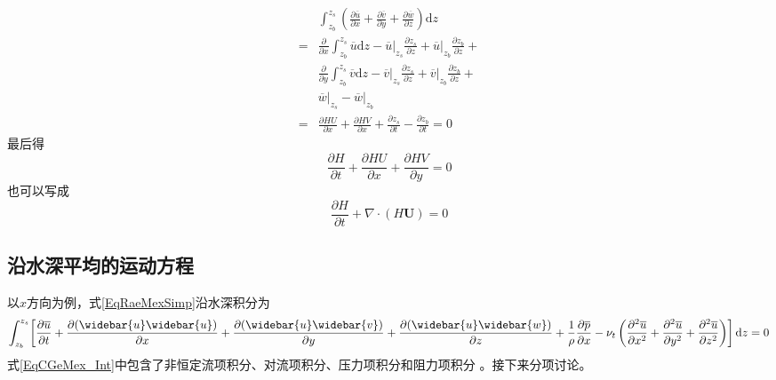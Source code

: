 \begin{equation*}
  \begin{aligned}
    &\int_{z_{b}}^{ z_{s}}\!
    \left(
    \frac{\partial \overline{u}}{\partial x} +
    \frac{\partial \overline{v}}{\partial y} +
    \frac{\partial \overline{w}}{\partial z}
    \right)
    \mathrm{d}z
    \\
    =&
    \frac{\partial}{\partial x}
    \int_{z_{b}}^{ z_{s}}\!
    \overline{u}
    \mathrm{d}z
    -
    \left.\overline{u}\right|_{z_{s}}
    \frac{\partial z_{s}}{\partial z}
    +
    \left.\overline{u}\right|_{z_{b}}
    \frac{\partial z_{b}}{\partial z}
    + \\
    &
    \frac{\partial}{\partial y}
    \int_{z_{b}}^{ z_{s}}\!
    \overline{v}
    \mathrm{d}z
    -
    \left.\overline{v}\right|_{z_{s}}
    \frac{\partial z_{s}}{\partial z}
    +
    \left.\overline{v}\right|_{z_{b}}
    \frac{\partial z_{b}}{\partial z}
    + \\
    &
    \left.\overline{w}\right|_{z_{s}}
    -
    \left.\overline{w}\right|_{z_{b}}
    \\
    =&
    \frac{\partial HU}{\partial x} +
    \frac{\partial HV}{\partial x} +
    \frac{\partial  z_{s}}{\partial t} -
    \frac{\partial z_{b}}{\partial t}
    =
    0
  \end{aligned}
\end{equation*}
最后得
\begin{equation}
  \frac{\partial H}{\partial t} +
  \frac{\partial HU}{\partial x} +
  \frac{\partial HV}{\partial y}
  =
  0
\end{equation}
也可以写成
\begin{equation}
  \frac{\partial H}{\partial t} +
  \nabla\cdot(H\mathbf{U})
  =
  0
\end{equation}

\subsection{沿水深平均的运动方程}
以$x$方向为例，式\eqref{EqRaeMexSimp}沿水深积分为
\begin{equation}
  \int_{z_{b}}^{ z_{s}}\!
  \left[
    \frac{\partial \overline{u}}{\partial t} +
    \frac{\partial (\widebar{u}\widebar{u})}{\partial x} +
    \frac{\partial (\widebar{u}\widebar{v})}{\partial y} +
    \frac{\partial (\widebar{u}\widebar{w})}{\partial z} +
    \frac{1}{\rho}\frac{\partial \overline{p}}{\partial x} -
    \nu_{t}
    \left(
    \frac{\partial^{2} \overline{u}}{\partial x^{2}} +
    \frac{\partial^{2} \overline{u}}{\partial y^{2}} +
    \frac{\partial^{2} \overline{u}}{\partial z^{2}}
    \right)
  \right]
  \mathrm{d}z
  =
  0
  \label{EqCGeMex_Int}
\end{equation}
式\eqref{EqCGeMex_Int}中包含了非恒定流项积分、对流项积分、压力项积分和阻力项积分
。接下来分项讨论。

